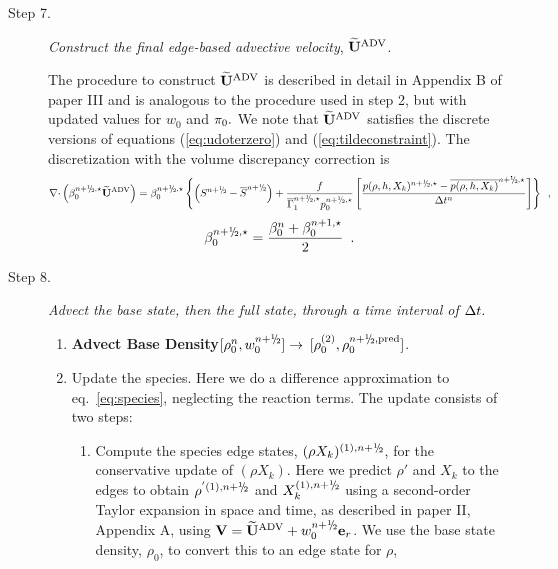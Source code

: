 \begin{description}
\begin{enumerate}
\end{enumerate}

\item[Step 7.] {\em Construct the final edge-based advective velocity}, $\widetilde{\mathbf{U}}^{\mathrm{ADV}}$.

The procedure to construct $\widetilde{\mathbf{U}}^{\mathrm{ADV}}$ is described in detail in Appendix B of paper III
and is analogous to the procedure used in step 2, but with updated values
for $w_0$ and $\pi_0.$  We note that $\widetilde{\mathbf{U}}^{\mathrm{ADV}}$ satisfies the discrete versions of 
equations (\ref{eq:udoterzero}) and (\ref{eq:tildeconstraint}).   The discretization
with the volume discrepancy correction is
\begin{equation}
\nablab \cdotb \left(\beta_0^{\nph,\star} \uadvtwo\right) =
\beta_0^{\nph,\star}\left\{\left(S^{\nph} - \overline{S}^{\nph}\right)
 + \frac{f}{\gammabar^{\nph,\star} p_0^{\nph,\star}}
\left[\frac{p(\rho,h,X_k)^{\nph,\star} - \overline{p(\rho,h,X_k)}^{\nph,\star}}{\Delta t^n}\right]\right\} \enskip ,
\end{equation}
\begin{equation}
\beta_0^{\nph,\star} = \frac{ \beta_0^n +  \beta_0^{n+1,\star} }{2} \enskip .
\end{equation}

\item[Step 8.] {\em Advect the base state, then the full state, through a time interval of $\Delta t.$}

\begin{enumerate}
\renewcommand{\theenumi}{{\bf \alph{enumi}}}

\item {\bf Advect Base Density}$[\rho_0^{n},w_0^{\nph}] \rightarrow$ 
$[\rho_0^{(2)}, \rho_0^{\nph,{\rm pred}}]$.

\item Update the species.  Here we do a difference approximation to
  eq.~\ref{eq:species}, neglecting the reaction terms.  The
  update consists of two steps:

  \begin{enumerate}
  \renewcommand{\labelenumii}{{\bf \roman{enumii}}.}

  \item Compute the species edge states, $(\rho X_k)^{(1),\nph}$, for
    the conservative update of $(\rho X_k)$.  Here we predict $\rho'$ 
    and $X_k$ to the edges to obtain $\rho^{'(1),\nph}$ and 
    $X_k^{(1),\nph}$ using a second-order Taylor expansion in
    space and time, as described in paper II, Appendix A, using $\Vb =
    \uadvtwo+w_0^{\nph} \er$.  We use the base
    state density, $\rho_0$, to convert this to an edge state for $\rho$,


\end{enumerate}
\end{enumerate}
\end{description}
